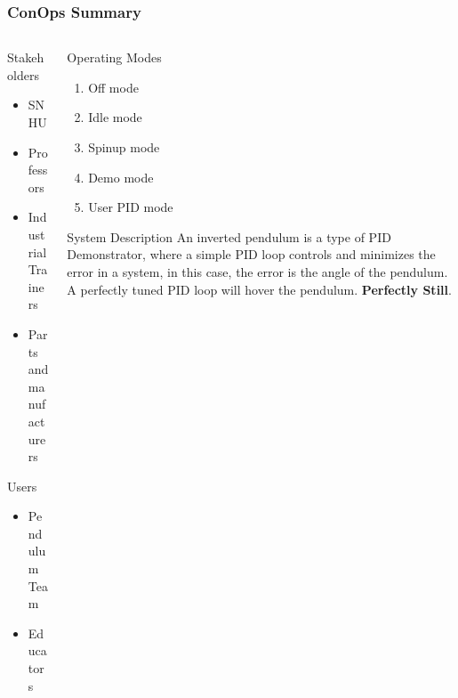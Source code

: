 \documentclass[aspectratio=169]{beamer}
\begin{document}
\begin{frame}
    \frametitle{ConOps Summary}

    \begin{columns}

    \begin{column}{0.34\textwidth}
        Stakeholders
        \begin{itemize}
         \item SNHU
         \item Professors
         \item Industrial Trainers
         \item Parts and manufacturers
        \end{itemize}

        Users
        \begin{itemize}
         \item Pendulum Team
         \item Educators
        \end{itemize}
    \end{column}

    \begin{column}{0.65\textwidth}
        \begin{block}{Operating Modes}
            \begin{enumerate}
            \item Off mode
            \item Idle mode
            \item Spinup mode
            \item Demo mode
            \item User PID mode
            \end{enumerate}
        \end{block}

        \begin{block}{System Description}
            \small{An inverted pendulum is a type of PID Demonstrator, where a simple PID loop
            controls and minimizes the error in a system, in this case, the error is the angle of the pendulum. A perfectly tuned PID loop will hover the pendulum.}
            \textbf{Perfectly Still}.
        \end{block}
    \end{column}
\end{columns}

\end{frame}
\end{document}
